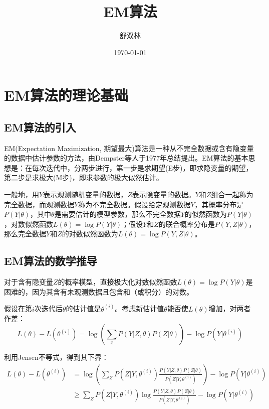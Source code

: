 \documentclass[a4paper,12pt]{ctexart} %
\title{EM算法}
\author{舒双林}
\date{\today}
\begin{document}
\maketitle

\tableofcontents
\newpage

\section{EM算法的理论基础}

\subsection{EM算法的引入}

EM(Expectation Maximization, 期望最大)算法是一种从不完全数据或含有隐变量的数据中估计参数的方法，由Dempster等人于1977年总结提出。EM算法的基本思想是：在每次迭代中，分两步进行，第一步是求期望(E步)，即求隐变量的期望，第二步是求极大(M步)，即求参数的极大似然估计。

一般地，用$Y$表示观测随机变量的数据，$Z$表示隐变量的数据。$Y$和$Z$组合一起称为完全数据，而观测数据$Y$称为不完全数据。假设给定观测数据$Y$，其概率分布是$P(Y|\theta)$，其中$\theta$是需要估计的模型参数，那么不完全数据$Y$的似然函数为$P(Y|\theta)$，对数似然函数$L(\theta)=\log P(Y|\theta)$；假设$Y$和$Z$的联合概率分布是$P(Y,Z|\theta)$，那么完全数据$Y$和$Z$的对数似然函数为$L(\theta)=\log P(Y,Z|\theta)$。

\subsection{EM算法的数学推导}

对于含有隐变量$Z$的概率模型，直接极大化对数似然函数$L(\theta)=\log P(Y|\theta)$是困难的，因为其含有未观测数据且包含和（或积分）的对数。

假设在第$i$次迭代后$\theta$的估计值是$\theta^{(i)}$。考虑新估计值$\theta$能否使$L(\theta)$增加，对两者作差：
\begin{equation}
L(\theta) - L(\theta^{(i)}) = \log \left( \sum_{Z} P(Y|Z,\theta)P(Z|\theta) \right) - \log P(Y|\theta^{(i)})
\end{equation}

利用Jensen不等式，得到其下界：
\begin{align}
L(\theta) - L(\theta^{(i)}) &= \log \left( \sum_{Z} P(Z|Y,\theta^{(i)}) \frac{P(Y|Z,\theta)P(Z|\theta)}{P(Z|Y,\theta^{(i)})} \right) - \log P(Y|\theta^{(i)}) \\
&\geq \sum_{Z} P(Z|Y,\theta^{(i)}) \log \frac{P(Y|Z,\theta)P(Z|\theta)}{P(Z|Y,\theta^{(i)})} - \log P(Y|\theta^{(i)})
\end{align}
\end{document}
